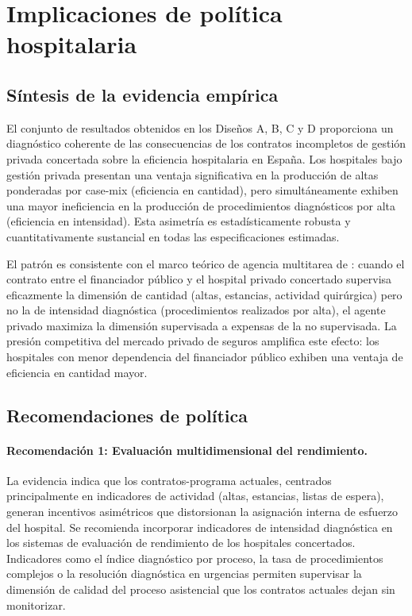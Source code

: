 
\section{Implicaciones de política hospitalaria}
\label{sec:politica}

\subsection{Síntesis de la evidencia empírica}
\label{subsec:sintesis}

El conjunto de resultados obtenidos en los Diseños A, B, C y D proporciona un diagnóstico coherente de las consecuencias de los contratos incompletos de gestión privada concertada sobre la eficiencia hospitalaria en España. Los hospitales bajo gestión privada presentan una ventaja significativa en la producción de altas ponderadas por case-mix (eficiencia en cantidad), pero simultáneamente exhiben una mayor ineficiencia en la producción de procedimientos diagnósticos por alta (eficiencia en intensidad). Esta asimetría es estadísticamente robusta y cuantitativamente sustancial en todas las especificaciones estimadas.

El patrón es consistente con el marco teórico de agencia multitarea de \citet{holmstrom1991multitask}: cuando el contrato entre el financiador público y el hospital privado concertado supervisa eficazmente la dimensión de cantidad (altas, estancias, actividad quirúrgica) pero no la de intensidad diagnóstica (procedimientos realizados por alta), el agente privado maximiza la dimensión supervisada a expensas de la no supervisada. La presión competitiva del mercado privado de seguros amplifica este efecto: los hospitales con menor dependencia del financiador público exhiben una ventaja de eficiencia en cantidad mayor.

\subsection{Recomendaciones de política}
\label{subsec:recomendaciones}

\paragraph{Recomendación 1: Evaluación multidimensional del rendimiento.}
La evidencia indica que los contratos-programa actuales, centrados principalmente en indicadores de actividad (altas, estancias, listas de espera), generan incentivos asimétricos que distorsionan la asignación interna de esfuerzo del hospital. Se recomienda incorporar indicadores de intensidad diagnóstica en los sistemas de evaluación de rendimiento de los hospitales concertados. Indicadores como el índice diagnóstico por proceso, la tasa de procedimientos complejos o la resolución diagnóstica en urgencias permiten supervisar la dimensión de calidad del proceso asistencial que los contratos actuales dejan sin monitorizar.

